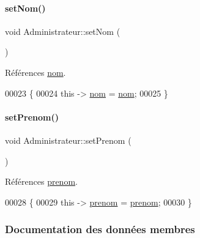 \paragraph{\texorpdfstring{set\+Nom()}{setNom()}}
{\footnotesize\ttfamily void Administrateur\+::set\+Nom (\begin{DoxyParamCaption}{ }\end{DoxyParamCaption})}



Références \hyperlink{class_administrateur_add094b9c6e352f62dda4802da530eeef}{nom}.


\begin{DoxyCode}
00023 \{
00024     \textcolor{keyword}{this} -> \hyperlink{class_administrateur_add094b9c6e352f62dda4802da530eeef}{nom} = \hyperlink{class_administrateur_add094b9c6e352f62dda4802da530eeef}{nom};
00025 \}
\end{DoxyCode}
\mbox{\label{class_administrateur_a9dd74a2ca87a1ab7618ebfbe50562731}} 
\paragraph{\texorpdfstring{set\+Prenom()}{setPrenom()}}
{\footnotesize\ttfamily void Administrateur\+::set\+Prenom (\begin{DoxyParamCaption}{ }\end{DoxyParamCaption})}



Références \hyperlink{class_administrateur_a1cb0671f334a62649e3fc147cc8c97e8}{prenom}.


\begin{DoxyCode}
00028 \{
00029     \textcolor{keyword}{this} -> \hyperlink{class_administrateur_a1cb0671f334a62649e3fc147cc8c97e8}{prenom} = \hyperlink{class_administrateur_a1cb0671f334a62649e3fc147cc8c97e8}{prenom};
00030 \}
\end{DoxyCode}


\subsubsection{Documentation des données membres}
\mbox{\label{class_administrateur_ad9b23ebebd0fd973c359962c8bb1520b}} 
